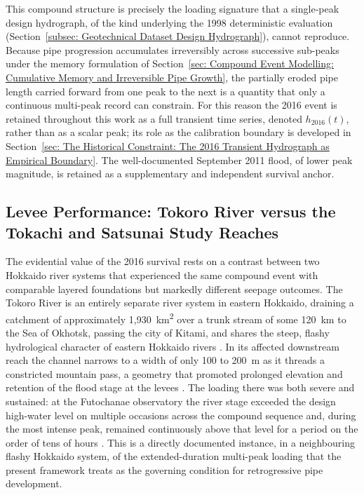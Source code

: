 This compound structure is precisely the loading signature that a single-peak design hydrograph, of the kind underlying the 1998 deterministic evaluation (Section~\ref{subsec: Geotechnical Dataset Design Hydrograph}), cannot reproduce. Because pipe progression accumulates irreversibly across successive sub-peaks under the memory formulation of Section~\ref{sec: Compound Event Modelling: Cumulative Memory and Irreversible Pipe Growth}, the partially eroded pipe length carried forward from one peak to the next is a quantity that only a continuous multi-peak record can constrain. For this reason the 2016 event is retained throughout this work as a full transient time series, denoted $h_{2016}(t)$, rather than as a scalar peak; its role as the calibration boundary is developed in Section~\ref{sec: The Historical Constraint: The 2016 Transient Hydrograph as Empirical Boundary}. The well-documented September 2011 flood, of lower peak magnitude, is retained as a supplementary and independent survival anchor.

\subsection{Levee Performance: Tokoro River versus the Tokachi and Satsunai Study Reaches}
\label{subsec: Levee Performance: Tokoro River versus the Tokachi and Satsunai Study Reaches}

The evidential value of the 2016 survival rests on a contrast between two Hokkaido river systems that experienced the same compound event with comparable layered foundations but markedly different seepage outcomes. The Tokoro River is an entirely separate river system in eastern Hokkaido, draining a catchment of approximately 1{,}930~km\textsuperscript{2} over a trunk stream of some 120~km to the Sea of Okhotsk, passing the city of Kitami, and shares the steep, flashy hydrological character of eastern Hokkaido rivers \parencite{tokorogawa_2017}. In its affected downstream reach the channel narrows to a width of only 100 to 200~m as it threads a constricted mountain pass, a geometry that promoted prolonged elevation and retention of the flood stage at the levees \parencite{morita_2018}. The loading there was both severe and sustained: at the Futochanae observatory the river stage exceeded the design high-water level on multiple occasions across the compound sequence and, during the most intense peak, remained continuously above that level for a period on the order of tens of hours \parencite{morita_2018}. This is a directly documented instance, in a neighbouring flashy Hokkaido system, of the extended-duration multi-peak loading that the present framework treats as the governing condition for retrogressive pipe development.

